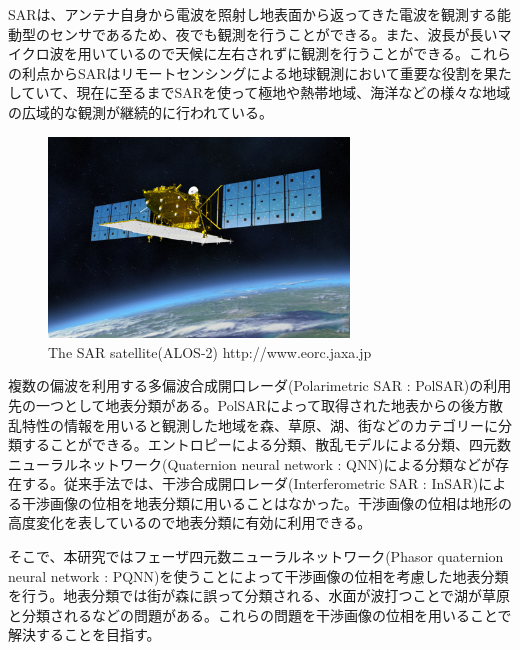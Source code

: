 \documentclass[a4j, twocolumn]{jsarticle}
\begin{document}
SARは、アンテナ自身から電波を照射し地表面から返ってきた電波を観測する能動型のセンサであるため、夜でも観測を行うことができる。また、波長が長いマイクロ波を用いているので天候に左右されずに観測を行うことができる。これらの利点からSARはリモートセンシングによる地球観測において重要な役割を果たしていて、現在に至るまでSARを使って極地や熱帯地域、海洋などの様々な地域の広域的な観測が継続的に行われている\cite{ouchi}。
 \begin{figure}[!t]
 \centering
 \includegraphics[width=8cm]{alos2.jpg}
 \caption{The SAR satellite(ALOS-2) http://www.eorc.jaxa.jp
}
 \label{fig:SAR}
\end{figure}
複数の偏波を利用する多偏波合成開口レーダ(Polarimetric SAR : PolSAR)の利用先の一つとして地表分類がある。PolSARによって取得された地表からの後方散乱特性の情報を用いると観測した地域を森、草原、湖、街などのカテゴリーに分類することができる。エントロピーによる分類\cite{cloude1997entropy,pottier2000application,lee1999unsupervised}、散乱モデルによる分類\cite{freeman1998three,yamaguchi2005four,singh2018model}、四元数ニューラルネットワーク(Quaternion neural network : QNN)による分類\cite{shang2014quaternion,kinugawa2018isotropization}などが存在する。従来手法では、干渉合成開口レーダ(Interferometric SAR : InSAR)による干渉画像の位相を地表分類に用いることはなかった。干渉画像の位相は地形の高度変化を表しているので地表分類に有効に利用できる。

そこで、本研究ではフェーザ四元数ニューラルネットワーク(Phasor quaternion neural network : PQNN)を使うことによって干渉画像の位相を考慮した地表分類を行う。地表分類では街が森に誤って分類される、水面が波打つことで湖が草原と分類されるなどの問題がある。これらの問題を干渉画像の位相を用いることで解決することを目指す。
\end{document}
